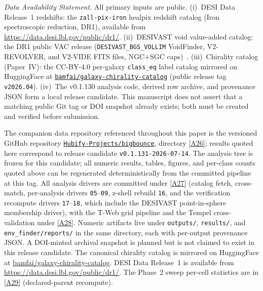 \documentclass[aps,prd,twocolumn,superscriptaddress,showpacs,preprintnumbers,nofootinbib,longbibliography,floatfix]{revtex4-2}
\newcommand{\repoBase}{https://github.com/Hubify-Projects/bigbounce/blob/main}
\newcommand{\paperVersion}{v0.1.131-2026-07-14}
\begin{document}
\emph{Data Availability Statement.} All primary inputs are public.
(i)~DESI Data Release~1 redshifts: the \texttt{zall-pix-iron} healpix
redshift catalog (Iron spectroscopic reduction, DR1), available from
\url{https://data.desi.lbl.gov/public/dr1/}.
(ii)~DESIVAST void value-added catalog: the DR1 public VAC release
(\texttt{DESIVAST\_BGS\_VOLLIM} VoidFinder, V2-REVOLVER, and V2-VIDE
FITS files, NGC$+$SGC caps)~\cite{DESIVAST2025}.
(iii)~Chirality catalog (Paper~IV): the CC-BY-4.0 per-galaxy
\texttt{class\_eq} label catalog mirrored on HuggingFace at
\href{https://huggingface.co/datasets/bamfai/galaxy-chirality-catalog}%
{\texttt{bamfai/galaxy-chirality-catalog}} (public release tag
\texttt{v2026.04}).
(iv)~The v0.1.130 analysis code, derived row archive, and provenance JSON
form a local release candidate. This manuscript does not assert that a
matching public Git tag or DOI snapshot already exists; both must be
created and verified before submission.

The companion data repository referenced throughout this paper is the
versioned GitHub repository
\href{https://github.com/Hubify-Projects/bigbounce}%
{\texttt{Hubify-Projects/bigbounce}}, directory
\href{\repoBase/pipelines/p5\_desi\_chirality/}{[A26]}; results quoted here
correspond to release candidate \texttt{\paperVersion}. The analysis
tree is frozen for this candidate; all numeric results, tables,
figures, and per-class counts quoted above can be regenerated
deterministically from the committed pipeline at this tag. All analysis
drivers are committed under
\href{\repoBase/pipelines/p5\_desi\_chirality/scripts/}{[A27]} (catalog fetch,
cross-match, per-analysis drivers \texttt{05}--\texttt{09}, z-shell
rebuild \texttt{16}, and the verification recompute drivers
\texttt{17}--\texttt{18}, which include the DESIVAST point-in-sphere
membership driver), with the T-Web grid pipeline and the Tempel
cross-validation under
\href{\repoBase/pipelines/p5\_desi\_chirality/env\_finder/}{[A28]}. Numeric
artifacts live under \texttt{outputs/}, \texttt{results/}, and
\texttt{env\_finder/reports/} in the same directory, each with
per-output provenance JSON. A DOI-minted archival snapshot is planned
but is not claimed to exist in this release candidate. The canonical chirality
catalog is mirrored on HuggingFace at
\href{https://huggingface.co/datasets/bamfai/galaxy-chirality-catalog}%
{bamfai/galaxy-chirality-catalog}. DESI Data Release~1 is available from
\url{https://data.desi.lbl.gov/public/dr1/}. The Phase~2 sweep
per-cell statistics are in
\href{\repoBase/pipelines/p5\_desi\_chirality/env\_finder/reports/02\_phase2\_sweep.csv}{[A29]}
(declared-parent recompute).
\end{document}
